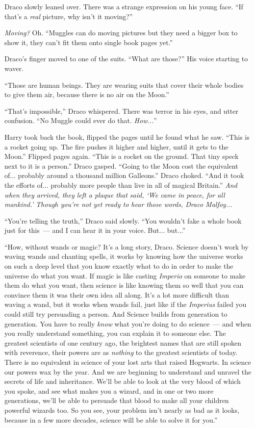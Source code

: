 Draco slowly leaned over. There was a strange expression on his young face. ``If that's a \emph{real} picture, why isn't it moving?''

\emph{Moving?} Oh. ``Muggles can do moving pictures but they need a bigger box to show it, they can't fit them onto single book pages yet.''

Draco's finger moved to one of the suits. ``What are those?'' His voice starting to waver.

``Those are human beings. They are wearing suits that cover their whole bodies to give them air, because there is no air on the Moon.''

``That's impossible,'' Draco whispered. There was terror in his eyes, and utter confusion. ``No Muggle could ever do that. \emph{How...}''

Harry took back the book, flipped the pages until he found what he saw. ``This is a rocket going up. The fire pushes it higher and higher, until it gets to the Moon.'' Flipped pages again. ``This is a rocket on the ground. That tiny speck next to it is a person.'' Draco gasped. ``Going to the Moon cost the equivalent of... probably around a thousand million Galleons.'' Draco choked. ``And it took the efforts of... probably more people than live in all of magical Britain.'' \emph{And when they arrived, they left a plaque that said, `We came in peace, for all mankind.' Though you're not yet ready to hear those words, Draco Malfoy...}

``You're telling the truth,'' Draco said slowly. ``You wouldn't fake a whole book just for this~--- and I can hear it in your voice. But... but...''

``How, without wands or magic? It's a long story, Draco. Science doesn't work by waving wands and chanting spells, it works by knowing how the universe works on such a deep level that you know exactly what to do in order to make the universe do what you want. If magic is like casting \emph{Imperio} on someone to make them do what you want, then science is like knowing them so well that you can convince them it was their own idea all along. It's a lot more difficult than waving a wand, but it works when wands fail, just like if the \emph{Imperius} failed you could still try persuading a person. And Science builds from generation to generation. You have to really \emph{know} what you're doing to do science~--- and when you really understand something, you can explain it to someone else. The greatest scientists of one century ago, the brightest names that are still spoken with reverence, their powers are as \emph{nothing} to the greatest scientists of today. There is no equivalent in science of your lost arts that raised Hogwarts. In science our powers wax by the year. And we are beginning to understand and unravel the secrets of life and inheritance. We'll be able to look at the very blood of which you spoke, and see what makes you a wizard, and in one or two more generations, we'll be able to persuade that blood to make all your children powerful wizards too. So you see, your problem isn't nearly as bad as it looks, because in a few more decades, science will be able to solve it for you.''

